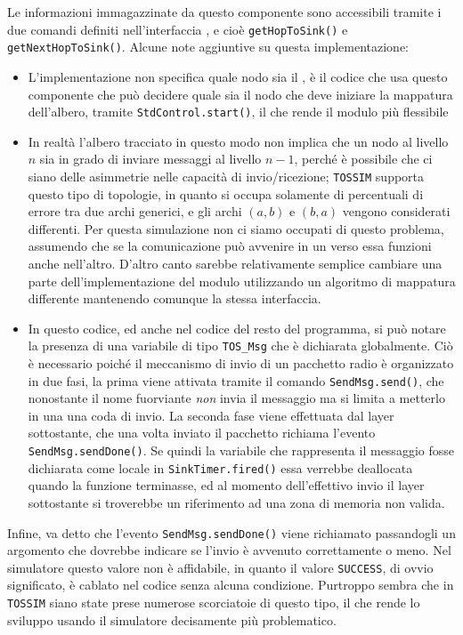 \documentclass[twoside,11pt,a4paper,italian,openany]{book}
\newcommand{\tos}{\texttt{TOSSIM} }
\begin{document}
Le informazioni immagazzinate da questo componente sono accessibili tramite i due comandi 
definiti nell'interfaccia \treedata, e cioè \texttt{getHopToSink()} e \texttt{getNextHopToSink()}. 
Alcune note aggiuntive su questa implementazione:
\begin{itemize}
\item{L'implementazione non specifica quale nodo sia il \sink, è il codice che usa questo 
componente che può decidere quale sia il nodo che deve iniziare la mappatura dell'albero, 
tramite \texttt{StdControl.start()}, il che rende il modulo più flessibile}

\item{In realtà l'albero tracciato in questo modo non implica che un nodo al livello $n$ sia in 
grado di inviare messaggi al livello $n-1$, perché è possibile che ci siano delle asimmetrie 
nelle capacità di invio/ricezione; \tos supporta questo tipo di topologie, in quanto si 
occupa solamente di percentuali di errore tra due archi generici, e gli archi $(a,b)$ e $(b,a)$ 
vengono considerati differenti. Per questa simulazione non ci siamo occupati di questo problema,
assumendo che se la comunicazione può avvenire in un verso essa funzioni anche nell'altro. 
D'altro canto sarebbe relativamente semplice cambiare una parte dell'implementazione del modulo 
\tree utilizzando un algoritmo di mappatura differente mantenendo comunque la stessa 
interfaccia.}

\item{In questo codice, ed anche nel codice del resto del programma, si può notare la presenza 
di una variabile di tipo \texttt{TOS\_Msg} che è dichiarata globalmente.
Ciò è necessario poiché il meccanismo di invio di un pacchetto radio è organizzato in due fasi, 
la prima viene attivata tramite il comando \texttt{SendMsg.send()}, che nonostante il nome 
fuorviante \emph{non} invia il messaggio ma si limita a metterlo in una una coda di invio.
La seconda fase viene effettuata dal layer sottostante, che una volta inviato il pacchetto 
richiama l'evento \texttt{SendMsg.sendDone()}. 
Se quindi la variabile che rappresenta il messaggio fosse dichiarata come locale in 
\texttt{SinkTimer.fired()} essa verrebbe deallocata quando la funzione terminasse,  
ed al momento dell'effettivo invio il layer sottostante si troverebbe un riferimento 
ad una zona di memoria non valida. }
\end{itemize}

Infine, va detto che l'evento \texttt{SendMsg.sendDone()} viene richiamato passandogli un 
argomento che  dovrebbe indicare se l'invio è avvenuto correttamente o meno. 
Nel simulatore questo valore non è affidabile, in quanto il valore \texttt{SUCCESS}, di ovvio 
significato, è cablato nel codice senza alcuna condizione. 
Purtroppo sembra che in \tos siano state prese numerose scorciatoie di questo tipo, il che 
rende lo sviluppo usando il simulatore decisamente più problematico. 
\end{document}
